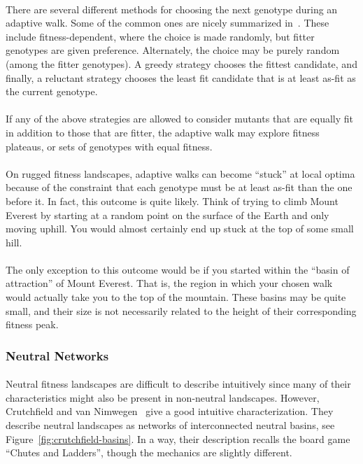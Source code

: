 \documentclass[12pt,letterpaper,titlepage]{article}
\begin{document}
\paragraph{}
There are several different methods for choosing the next genotype during an
adaptive walk. Some of the common ones are nicely summarized
in~\cite{Nowak2015}. These include fitness-dependent, where the choice is made
randomly, but fitter genotypes are given preference. Alternately, the choice
may be purely random (among the fitter genotypes). A greedy strategy chooses
the fittest candidate, and finally, a reluctant strategy chooses the least fit
candidate that is at least as-fit as the current genotype.

\paragraph{}
If any of the above strategies are allowed to consider mutants that are equally
fit in addition to those that are fitter, the adaptive walk may explore fitness
plateaus, or sets of genotypes with equal fitness.

\paragraph{}
On rugged fitness landscapes, adaptive walks can become ``stuck'' at local
optima because of the constraint that each genotype must be at least as-fit
than the one before it. In fact, this outcome is quite likely. Think of trying
to climb Mount Everest by starting at a random point on the surface of the
Earth and only moving uphill. You would almost certainly end up stuck at the
top of some small hill.

\paragraph{}
The only exception to this outcome would be if you started within the ``basin
of attraction'' of Mount Everest. That is, the region in which your chosen walk
would actually take you to the top of the mountain. These basins may be quite
small, and their size is not necessarily related to the height of their
corresponding fitness peak.

\subsubsection{Neutral Networks}

\paragraph{}
Neutral fitness landscapes are difficult to describe intuitively since many of
their characteristics might also be present in non-neutral landscapes. However,
Crutchfield and van Nimwegen~\cite{Crutchfield1999} give a good intuitive
characterization. They describe neutral landscapes as networks of
interconnected neutral basins, see Figure~\ref{fig:crutchfield-basins}. In a
way, their description recalls the board game ``Chutes and Ladders'', though
the mechanics are slightly different.
\end{document}
